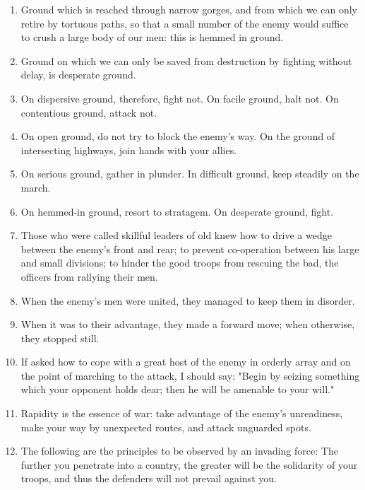 \begin{enumerate}
  \item Ground which is reached through narrow gorges, and from which
    we can only retire by tortuous paths, so that a small number of
    the enemy would suffice to crush a large body of our men: this is
    hemmed in ground.

  \item Ground on which we can only be saved from destruction by
    fighting without delay, is desperate ground.

  \item On dispersive ground, therefore, fight not. On facile ground,
    halt not. On contentious ground, attack not.

  \item On open ground, do not try to block the enemy's way. On the
    ground of intersecting highways, join hands with your allies.

  \item On serious ground, gather in plunder. In difficult ground,
    keep steadily on the march.

  \item On hemmed-in ground, resort to stratagem. On desperate ground,
    fight.

  \item Those who were called skillful leaders of old knew how to
    drive a wedge between the enemy's front and rear; to prevent
    co-operation between his large and small divisions; to hinder the
    good troops from rescuing the bad, the officers from rallying
    their men.

  \item When the enemy's men were united, they managed to keep them in
    disorder.

  \item When it was to their advantage, they made a forward move; when
    otherwise, they stopped still.

  \item If asked how to cope with a great host of the enemy in orderly
    array and on the point of marching to the attack, I should say:
    "Begin by seizing something which your opponent holds dear; then
    he will be amenable to your will."

  \item Rapidity is the essence of war: take advantage of the enemy's
    unreadiness, make your way by unexpected routes, and attack
    unguarded spots.

  \item The following are the principles to be observed by an invading
    force: The further you penetrate into a country, the greater will
    be the solidarity of your troops, and thus the defenders will not
    prevail against you.


\end{enumerate}
